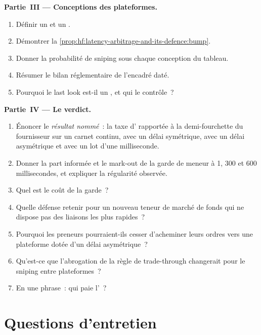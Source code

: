 \begin{problem}
\medskip\noindent\textbf{Partie~III --- Conceptions des plateformes.}
\begin{enumerate}[resume]
\item Définir un  et un .
\item Démontrer la \cref{prop:hf:latency-arbitrage-and-its-defence:bump}.
\item Donner la probabilité de sniping sous chaque conception du tableau.
\item Résumer le bilan réglementaire de l'encadré daté.
\item Pourquoi le last look est-il un , et qui le contrôle~?
\end{enumerate}

\medskip\noindent\textbf{Partie~IV --- Le verdict.}
\begin{enumerate}[resume]
\item Énoncer le \emph{résultat nommé}~: la taxe d' rapportée à la demi-fourchette du fournisseur sur un carnet continu, avec un délai symétrique,
avec un délai asymétrique et avec un lot d'une milliseconde.
\item Donner la part informée et le mark-out de la garde de meneur à 1, 300 et 600 millisecondes, et expliquer la régularité observée.
\item Quel est le coût de la garde~?
\item Quelle défense retenir pour un nouveau teneur de marché de fonds qui ne dispose pas des liaisons les plus rapides~?
\item Pourquoi les preneurs pourraient-ils cesser d'acheminer leurs ordres vers une plateforme dotée d'un délai asymétrique~?
\item Qu'est-ce que l'abrogation de la règle de trade-through changerait pour le sniping entre plateformes~?
\item En une phrase~: qui paie l'~?
\end{enumerate}
\end{problem}

\section{Questions d'entretien}

